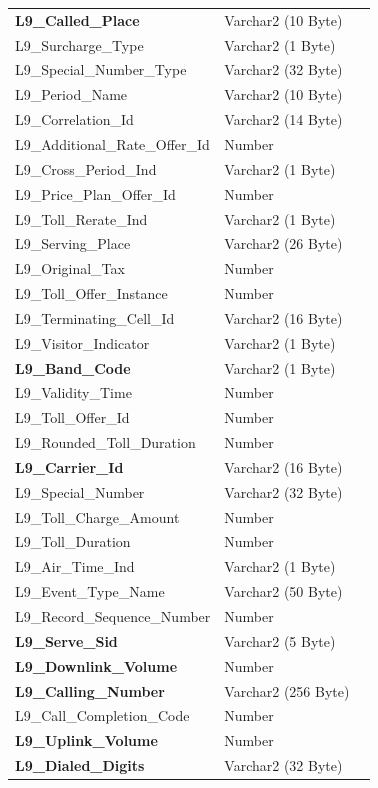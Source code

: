 \documentclass[12pt,twoside]{article}
\begin{document}
\begin{longtable}{l|l|l}
\textbf{L9\_Called\_Place} & Varchar2 (10 Byte) & \\
L9\_Surcharge\_Type & Varchar2 (1 Byte) & \\
L9\_Special\_Number\_Type & Varchar2 (32 Byte) & \\
L9\_Period\_Name & Varchar2 (10 Byte) & \\
L9\_Correlation\_Id & Varchar2 (14 Byte) & \\
L9\_Additional\_Rate\_Offer\_Id & Number & \\
L9\_Cross\_Period\_Ind & Varchar2 (1 Byte) & \\
L9\_Price\_Plan\_Offer\_Id & Number & \\
L9\_Toll\_Rerate\_Ind & Varchar2 (1 Byte) & \\
L9\_Serving\_Place & Varchar2 (26 Byte) & \\
L9\_Original\_Tax & Number & \\
L9\_Toll\_Offer\_Instance & Number & \\
L9\_Terminating\_Cell\_Id & Varchar2 (16 Byte) & \\
L9\_Visitor\_Indicator & Varchar2 (1 Byte) & \\
\textbf{L9\_Band\_Code} & Varchar2 (1 Byte) & \\
L9\_Validity\_Time & Number & \\
L9\_Toll\_Offer\_Id & Number & \\
L9\_Rounded\_Toll\_Duration & Number & \\
\textbf{L9\_Carrier\_Id} & Varchar2 (16 Byte) & \\
L9\_Special\_Number & Varchar2 (32 Byte) & \\
L9\_Toll\_Charge\_Amount & Number & \\
L9\_Toll\_Duration & Number & \\
L9\_Air\_Time\_Ind & Varchar2 (1 Byte) & \\
L9\_Event\_Type\_Name & Varchar2 (50 Byte) & \\
L9\_Record\_Sequence\_Number & Number & \\
\textbf{L9\_Serve\_Sid} & Varchar2 (5 Byte) & \\
\textbf{L9\_Downlink\_Volume} & Number & \\
\textbf{L9\_Calling\_Number} & Varchar2 (256 Byte) & \\
L9\_Call\_Completion\_Code & Number & \\
\textbf{L9\_Uplink\_Volume} & Number & \\
\textbf{L9\_Dialed\_Digits} & Varchar2 (32 Byte) & \\

\end{longtable}
\end{document}
